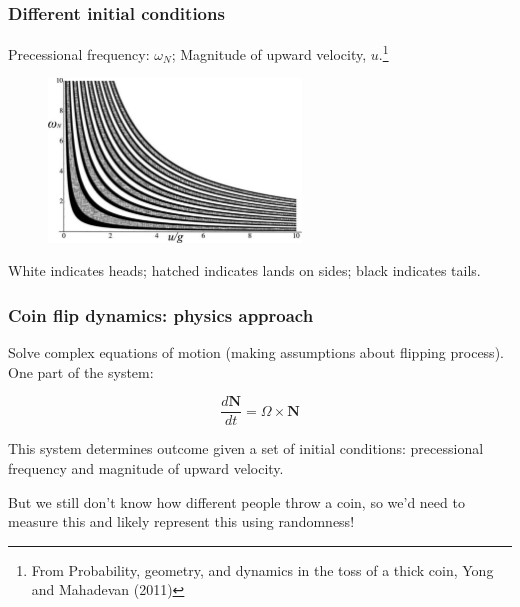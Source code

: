 \documentclass[handout]{beamer}
\begin{document}
\begin{frame}
	\frametitle{Different initial conditions}
	
	Precessional frequency: $\omega_N$; Magnitude of upward velocity, $u$.\footnote{\tiny From Probability, geometry, and dynamics in the toss of a thick coin, Yong and Mahadevan (2011)}
	
	\begin{figure}[ht]
		\centerline{\includegraphics[width=0.6\textwidth]{../figures/coin_toss.pdf}}
	\end{figure}
	
	White indicates heads; hatched indicates lands on sides; black indicates tails.
	
\end{frame}

\begin{frame}
	\frametitle{Coin flip dynamics: physics approach}
	
	Solve complex equations of motion (making assumptions about flipping process). One part of the system:
	
	\begin{equation}
	\frac{d\boldsymbol{N}}{dt} = \Omega \times \boldsymbol{N}
	\end{equation}
	
	This system determines outcome given a set of initial conditions: precessional frequency and magnitude of upward velocity.
	
	\vspace{0.5cm}
	But we still don't know how different people throw a coin, so we'd need to measure this and likely represent this using randomness!
	
\end{frame}
\end{document}
